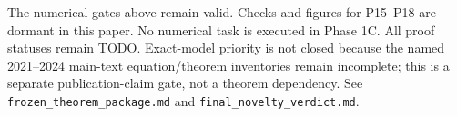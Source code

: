 The numerical gates above remain valid. Checks and figures for P15--P18 are
dormant in this paper. No numerical task is executed in Phase 1C. All proof
statuses remain TODO. Exact-model priority is not closed because the named
2021--2024 main-text equation/theorem inventories remain incomplete; this is
a separate publication-claim gate, not a theorem dependency. See
\texttt{frozen\_theorem\_package.md} and \texttt{final\_novelty\_verdict.md}.

